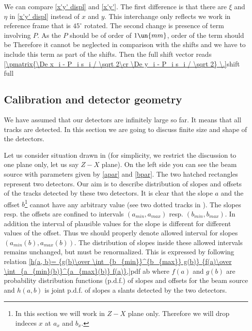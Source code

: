 We can compare \equs{} \ref{x'y' displ} and \ref{x'y'}. The first difference is that there are $\xi$ and $\eta$ in \equ{} \ref{x'y' displ} instead of $x$ and $y$. This interchange only reflects we work in reference frame that is $45^\circ$ rotated.
The second change is presence of term involving $P$. As the $P$ should be of order of $1\un{mm}$, order of the
term should be
Therefore it cannot be neglected in comparison with the shifts and we have to include this term as part of the shifts. Then the full shift vector reads
\eqref{\pmatrix{\De x_i - P_i s_i / \sqrt 2\cr \De y_i - P_i s_i / \sqrt 2} \.}{shift full}



\subsection{Calibration and detector geometry}
We have assumed that our detectors are infinitely large so far. It means that all tracks are detected. In this section we are going to discuss finite size and shape of the detectors.


Let us consider situation drawn in \fg{}  (for simplicity, we restrict the discussion to one plane only, let us say $Z-X$ plane). On the left side you can see the beam source with parameters given by \equs{} \ref{apar} and \ref{bpar}. The two hatched rectangles represent two detectors. Our aim is to describe distribution of slopes and offsets of the tracks detected by these two detectors. It is clear that the slope $a$ and the offset $b$\footnote{%
In this section we will work in $Z-X$ plane only. Therefore we will drop indeces $x$ at $a_x$ and $b_x$.}
cannot have any arbitrary value (see two dotted tracks in \fg{} ). The slopes resp. the offsets are confined to intervals $(a_{min}, a_{max})$ resp. $(b_{min}, b_{max})$. In addition the interval of plausible values for the slope is different for different values of the offset. Thus we should properly denote allowed interval for slopes $(a_{min}(b), a_{max}(b))$. The distribution of slopes inside these allowed intervals remains unchanged, but must be renormalized. This is expressed by following relation
\eqref{h(a, b)= {g(b)\over \int_{b_{min}}^{b_{max}} g(b)}  {f(a)\over \int_{a_{min}(b)}^{a_{max}(b)} f(a)},}{pdf ab}
where $f(a)$ and $g(b)$ are probability distribution functions (p.d.f.) of slopes and offsets for the beam source and $h(a, b)$ is joint p.d.f. of slopes a slants detected by the two detectors.

